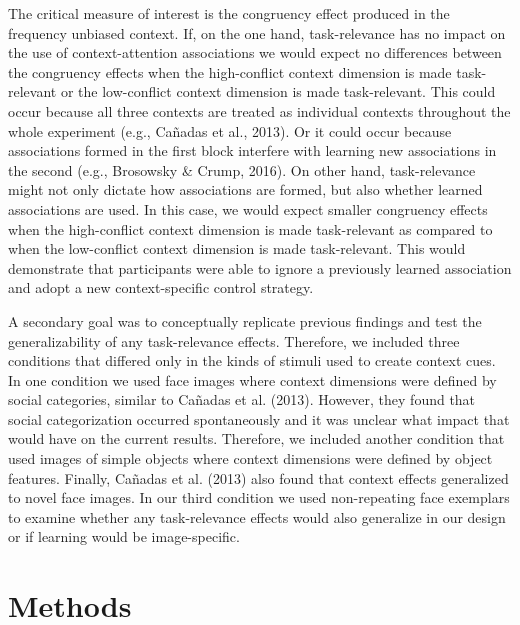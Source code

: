 \documentclass[english,,man,floatsintext]{apa6}
\begin{document}
The critical measure of interest is the congruency effect produced in
the frequency unbiased context. If, on the one hand, task-relevance has
no impact on the use of context-attention associations we would expect
no differences between the congruency effects when the high-conflict
context dimension is made task-relevant or the low-conflict context
dimension is made task-relevant. This could occur because all three
contexts are treated as individual contexts throughout the whole
experiment (e.g., Cañadas et al., 2013). Or it could occur because
associations formed in the first block interfere with learning new
associations in the second (e.g., Brosowsky \& Crump, 2016). On other
hand, task-relevance might not only dictate how associations are formed,
but also whether learned associations are used. In this case, we would
expect smaller congruency effects when the high-conflict context
dimension is made task-relevant as compared to when the low-conflict
context dimension is made task-relevant. This would demonstrate that
participants were able to ignore a previously learned association and
adopt a new context-specific control strategy.

A secondary goal was to conceptually replicate previous findings and
test the generalizability of any task-relevance effects. Therefore, we
included three conditions that differed only in the kinds of stimuli
used to create context cues. In one condition we used face images where
context dimensions were defined by social categories, similar to Cañadas
et al. (2013). However, they found that social categorization occurred
spontaneously and it was unclear what impact that would have on the
current results. Therefore, we included another condition that used
images of simple objects where context dimensions were defined by object
features. Finally, Cañadas et al. (2013) also found that context effects
generalized to novel face images. In our third condition we used
non-repeating face exemplars to examine whether any task-relevance
effects would also generalize in our design or if learning would be
image-specific.

\section{Methods}\label{methods}
\end{document}

